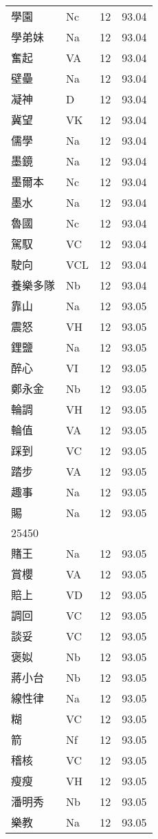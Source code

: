 \documentclass[twocolumn]{book}
\begin{document}
\begin{supertabular}{llrr}
學園 & Nc & 12 &  93.04\\
學弟妹 & Na & 12 &  93.04\\
奮起 & VA & 12 &  93.04\\
壁壘 & Na & 12 &  93.04\\
凝神 & D & 12 &  93.04\\
冀望 & VK & 12 &  93.04\\
儒學 & Na & 12 &  93.04\\
墨鏡 & Na & 12 &  93.04\\
墨爾本 & Nc & 12 &  93.04\\
墨水 & Na & 12 &  93.04\\
魯國 & Nc & 12 &  93.04\\
駕馭 & VC & 12 &  93.04\\
駛向 & VCL & 12 &  93.04\\
養樂多隊 & Nb & 12 &  93.04\\
靠山 & Na & 12 &  93.05\\
震怒 & VH & 12 &  93.05\\
鋰鹽 & Na & 12 &  93.05\\
醉心 & VI & 12 &  93.05\\
鄭永金 & Nb & 12 &  93.05\\
輪調 & VH & 12 &  93.05\\
輪值 & VA & 12 &  93.05\\
踩到 & VC & 12 &  93.05\\
踏步 & VA & 12 &  93.05\\
趣事 & Na & 12 &  93.05\\
賜 & Na & 12 &  93.05\\
25450\\
賭王 & Na & 12 &  93.05\\
賞櫻 & VA & 12 &  93.05\\
賠上 & VD & 12 &  93.05\\
調回 & VC & 12 &  93.05\\
談妥 & VC & 12 &  93.05\\
褒姒 & Nb & 12 &  93.05\\
蔣小台 & Nb & 12 &  93.05\\
線性律 & Na & 12 &  93.05\\
糊 & VC & 12 &  93.05\\
箭 & Nf & 12 &  93.05\\
稽核 & VC & 12 &  93.05\\
瘦瘦 & VH & 12 &  93.05\\
潘明秀 & Nb & 12 &  93.05\\
樂教 & Na & 12 &  93.05\\

\end{supertabular}
\end{document}
